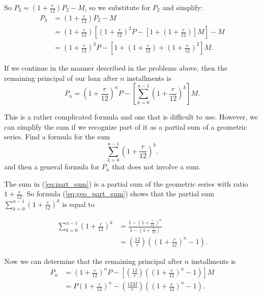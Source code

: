 \begin{exercises}
\begin{exerciseSolution}
So $P_3 = \left(1 + \frac{r}{12}\right)P_2 - M$, so we substitute for $P_2$ and simplify:
\begin{align*}
P_3 &= \left(1 + \frac{r}{12}\right)P_2 - M \\
	&=  \left(1 + \frac{r}{12}\right)\left[\left(1 + \frac{r}{12}\right)^2P - \left[1 + \left(1+\frac{r}{12}\right)\right] M\right] - M\\
	&= \left(1 + \frac{r}{12}\right)^3P - \left[1 + \left(1+\frac{r}{12}\right) + \left(1+\frac{r}{12}\right)^2 \right] M.
\end{align*}

\vs
\end{exerciseSolution}

    \item If we continue in the manner described in the problems above, then the remaining principal of our loan after $n$ installments is
\begin{equation} \label{eq:loan_1}
P_n = \left(1 + \frac{r}{12}\right)^nP - \left[\displaystyle \sum_{k=0}^{n-1} \left(1+\frac{r}{12}\right)^k \right] M.
\end{equation}

This is a rather complicated formula and one that is difficult to use. However, we can simplify the sum if we recognize part of  it as a partial sum of a geometric series. Find a formula for the sum
\begin{equation} \label{eq:part_sum}
\displaystyle \sum_{k=0}^{n-1} \left(1+\frac{r}{12}\right)^k.
\end{equation}
and then a general formula for $P_n$ that does not involve a sum.

\begin{exerciseSolution}

The sum in (\ref{eq:part_sum}) is a partial sum of the geometric series with ratio $1+\frac{r}{12}$. So formula (\ref{eq:geo_part_sum}) shows that the partial sum $\displaystyle \sum_{k=0}^{n-1} \left(1+\frac{r}{12}\right)^k$ is equal to

\begin{align*}
\displaystyle \sum_{k=0}^{n-1} \left(1+\frac{r}{12}\right)^k &= \frac{1-\left(1+\frac{r}{12}\right)^n}{1-\left(1+\frac{r}{12}\right)} \\
	&= \left(\frac{12}{r}\right) \left(\left(1+\frac{r}{12}\right)^n - 1\right).
\end{align*}

Now we can determine that the remaining principal after $n$ installments is
\begin{align*}
P_n &= \left(1 + \frac{r}{12}\right)^nP - \left[\left(\frac{12}{r}\right) \left(\left(1+\frac{r}{12}\right)^n - 1\right) \right] M \\
	&= P \left(1+\frac{r}{12}\right)^n - \left(\frac{12M}{r}\right) \left( \left(1+\frac{r}{12}\right)^n - 1\right).
\end{align*}


\end{exerciseSolution}
\end{exercises}
